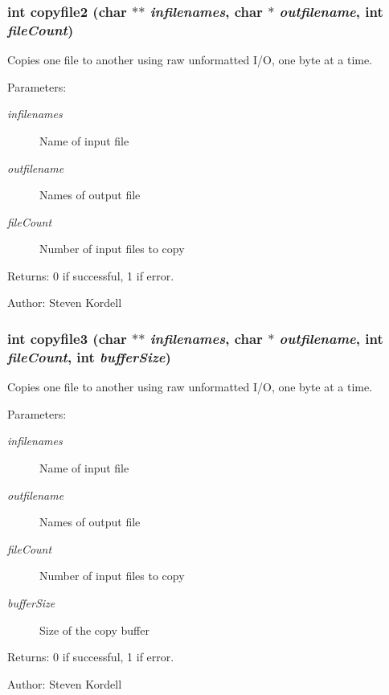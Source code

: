 \subsubsection{\setlength{\rightskip}{0pt plus 5cm}int copyfile2 (char $\ast$$\ast$ {\em infilenames}, char $\ast$ {\em outfilename}, int {\em file\-Count})}\label{cptest2_8c_88190ff8561edfed06fb1b9dc983b87e}


Copies one file to another using raw unformatted I/O, one byte at a time. \begin{Desc}
\item[Parameters:]
\begin{description}
\item[{\em infilenames}]Name of input file \item[{\em outfilename}]Names of output file \item[{\em file\-Count}]Number of input files to copy \end{description}
\end{Desc}
\begin{Desc}
\item[Returns:]0 if successful, 1 if error. \end{Desc}
\begin{Desc}
\item[Author:]Steven Kordell \end{Desc}
\subsubsection{\setlength{\rightskip}{0pt plus 5cm}int copyfile3 (char $\ast$$\ast$ {\em infilenames}, char $\ast$ {\em outfilename}, int {\em file\-Count}, int {\em buffer\-Size})}\label{cptest2_8c_07dc7601293343ac1311e1a614f91b82}


Copies one file to another using raw unformatted I/O, one byte at a time. \begin{Desc}
\item[Parameters:]
\begin{description}
\item[{\em infilenames}]Name of input file \item[{\em outfilename}]Names of output file \item[{\em file\-Count}]Number of input files to copy \item[{\em buffer\-Size}]Size of the copy buffer \end{description}
\end{Desc}
\begin{Desc}
\item[Returns:]0 if successful, 1 if error. \end{Desc}
\begin{Desc}
\item[Author:]Steven Kordell \end{Desc}
